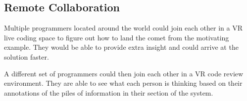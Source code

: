 \documentclass[conference]{IEEEtran}
\begin{document}
\subsection{Remote Collaboration}

Multiple programmers located around the world could join each other in a VR live coding space to figure out how to land the comet from the motivating example.
They would be able to provide extra insight and could arrive at the solution faster.

A different set of programmers could then join each other in a VR code review environment.
They are able to see what each person is thinking based on their annotations of the piles of information in their section of the system.





\end{document}

